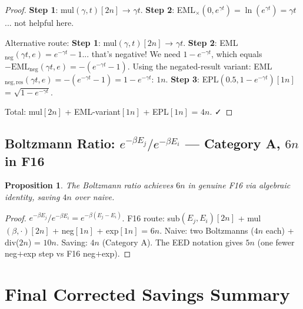 \documentclass[11pt]{article}
\newtheorem{proposition}[theorem]{Proposition}
\begin{document}
\begin{proof}
\textbf{Step 1}: mul$(\gamma, t)[2n]$ → $\gamma t$.
\textbf{Step 2}: EML$_\times(0, e^{\gamma t}) = \ln(e^{\gamma t}) = \gamma t$... not helpful here.

Alternative route:
\textbf{Step 1}: mul$(\gamma,t)[2n]$ → $\gamma t$.
\textbf{Step 2}: EML$_{\mathrm{neg}}(\gamma t, e) = e^{-\gamma t}-1$... that's negative!
We need $1-e^{-\gamma t}$, which equals $-\mathrm{EML}_{\mathrm{neg}}(\gamma t, e) = -(e^{-\gamma t}-1)$.
Using the negated-result variant: EML$_{\mathrm{neg,res}}(\gamma t, e) = -(e^{-\gamma t}-1) = 1-e^{-\gamma t}$: $1n$.
\textbf{Step 3}: EPL$(0.5, 1-e^{-\gamma t})[1n]$ = $\sqrt{1-e^{-\gamma t}}$.

Total: mul$[2n]$ + EML-variant$[1n]$ + EPL$[1n]$ = $4n$. ✓
\end{proof}

\subsection{Boltzmann Ratio: $e^{-\beta E_j}/e^{-\beta E_i}$ — Category A, $6n$ in F16}

\begin{proposition}
The Boltzmann ratio achieves $6n$ in genuine F16 via algebraic identity, saving $4n$ over naive.
\end{proposition}

\begin{proof}
$e^{-\beta E_j}/e^{-\beta E_i}=e^{-\beta(E_j-E_i)}$.
F16 route: sub$(E_j,E_i)[2n]$ + mul$(\beta,\cdot)[2n]$ + neg$[1n]$ + exp$[1n]$ = $6n$.
Naive: two Boltzmanns ($4n$ each) + div($2n$) = $10n$.
Saving: $4n$ (Category A). The EED notation gives $5n$ (one fewer neg$+$exp step vs F16 neg$+$exp).
\end{proof}

\section{Final Corrected Savings Summary}
\end{document}

